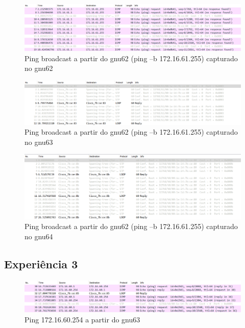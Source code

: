 \documentclass[article, a4paper, 11pt, oneside]{memoir}
\begin{document}
\newpage
\begin{figure}[h]
	\centering
\includegraphics[scale=0.45]{exp2-step10-broadcast-gnu62-from-gnu62.png}
\caption{Ping broadcast a partir do gnu62 (ping –b 172.16.61.255) capturado no gnu62}
\end{figure}


\begin{figure}[h]
	\centering
\includegraphics[scale=0.45]{exp2-step10-broadcast-gnu62-from-gnu63.png}
\caption{Ping broadcast a partir do gnu62 (ping –b 172.16.61.255) capturado no gnu63}
\end{figure}

\begin{figure}[h]
	\centering
\includegraphics[scale=0.45]{exp2-step10-broadcast-gnu62-from-gnu64.png}
\caption{Ping broadcast a partir do gnu62 (ping –b 172.16.61.255) capturado no gnu64}
\end{figure}

\newpage
\subsection{Experiência 3}
\begin{figure}[h]
	\centering
\includegraphics[scale=0.55]{exp3-step6-ping-60.254-from-gnu63.png}
\caption{Ping 172.16.60.254 a partir do gnu63}
\end{figure}
\end{document}
